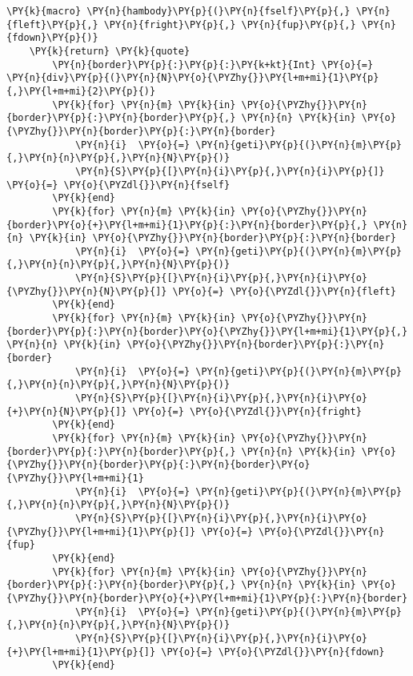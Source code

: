 \begin{Verbatim}[commandchars=\\\{\}]
\PY{k}{macro} \PY{n}{hambody}\PY{p}{(}\PY{n}{fself}\PY{p}{,} \PY{n}{fleft}\PY{p}{,} \PY{n}{fright}\PY{p}{,} \PY{n}{fup}\PY{p}{,} \PY{n}{fdown}\PY{p}{)}
    \PY{k}{return} \PY{k}{quote}
        \PY{n}{border}\PY{p}{:}\PY{p}{:}\PY{k+kt}{Int} \PY{o}{=} \PY{n}{div}\PY{p}{(}\PY{n}{N}\PY{o}{\PYZhy{}}\PY{l+m+mi}{1}\PY{p}{,}\PY{l+m+mi}{2}\PY{p}{)}
        \PY{k}{for} \PY{n}{m} \PY{k}{in} \PY{o}{\PYZhy{}}\PY{n}{border}\PY{p}{:}\PY{n}{border}\PY{p}{,} \PY{n}{n} \PY{k}{in} \PY{o}{\PYZhy{}}\PY{n}{border}\PY{p}{:}\PY{n}{border}
            \PY{n}{i}  \PY{o}{=} \PY{n}{geti}\PY{p}{(}\PY{n}{m}\PY{p}{,}\PY{n}{n}\PY{p}{,}\PY{n}{N}\PY{p}{)}
            \PY{n}{S}\PY{p}{[}\PY{n}{i}\PY{p}{,}\PY{n}{i}\PY{p}{]} \PY{o}{=} \PY{o}{\PYZdl{}}\PY{n}{fself}
        \PY{k}{end}
        \PY{k}{for} \PY{n}{m} \PY{k}{in} \PY{o}{\PYZhy{}}\PY{n}{border}\PY{o}{+}\PY{l+m+mi}{1}\PY{p}{:}\PY{n}{border}\PY{p}{,} \PY{n}{n} \PY{k}{in} \PY{o}{\PYZhy{}}\PY{n}{border}\PY{p}{:}\PY{n}{border}
            \PY{n}{i}  \PY{o}{=} \PY{n}{geti}\PY{p}{(}\PY{n}{m}\PY{p}{,}\PY{n}{n}\PY{p}{,}\PY{n}{N}\PY{p}{)}
            \PY{n}{S}\PY{p}{[}\PY{n}{i}\PY{p}{,}\PY{n}{i}\PY{o}{\PYZhy{}}\PY{n}{N}\PY{p}{]} \PY{o}{=} \PY{o}{\PYZdl{}}\PY{n}{fleft}
        \PY{k}{end}
        \PY{k}{for} \PY{n}{m} \PY{k}{in} \PY{o}{\PYZhy{}}\PY{n}{border}\PY{p}{:}\PY{n}{border}\PY{o}{\PYZhy{}}\PY{l+m+mi}{1}\PY{p}{,} \PY{n}{n} \PY{k}{in} \PY{o}{\PYZhy{}}\PY{n}{border}\PY{p}{:}\PY{n}{border}
            \PY{n}{i}  \PY{o}{=} \PY{n}{geti}\PY{p}{(}\PY{n}{m}\PY{p}{,}\PY{n}{n}\PY{p}{,}\PY{n}{N}\PY{p}{)}
            \PY{n}{S}\PY{p}{[}\PY{n}{i}\PY{p}{,}\PY{n}{i}\PY{o}{+}\PY{n}{N}\PY{p}{]} \PY{o}{=} \PY{o}{\PYZdl{}}\PY{n}{fright}
        \PY{k}{end}
        \PY{k}{for} \PY{n}{m} \PY{k}{in} \PY{o}{\PYZhy{}}\PY{n}{border}\PY{p}{:}\PY{n}{border}\PY{p}{,} \PY{n}{n} \PY{k}{in} \PY{o}{\PYZhy{}}\PY{n}{border}\PY{p}{:}\PY{n}{border}\PY{o}{\PYZhy{}}\PY{l+m+mi}{1}
            \PY{n}{i}  \PY{o}{=} \PY{n}{geti}\PY{p}{(}\PY{n}{m}\PY{p}{,}\PY{n}{n}\PY{p}{,}\PY{n}{N}\PY{p}{)}
            \PY{n}{S}\PY{p}{[}\PY{n}{i}\PY{p}{,}\PY{n}{i}\PY{o}{\PYZhy{}}\PY{l+m+mi}{1}\PY{p}{]} \PY{o}{=} \PY{o}{\PYZdl{}}\PY{n}{fup}
        \PY{k}{end}
        \PY{k}{for} \PY{n}{m} \PY{k}{in} \PY{o}{\PYZhy{}}\PY{n}{border}\PY{p}{:}\PY{n}{border}\PY{p}{,} \PY{n}{n} \PY{k}{in} \PY{o}{\PYZhy{}}\PY{n}{border}\PY{o}{+}\PY{l+m+mi}{1}\PY{p}{:}\PY{n}{border}
            \PY{n}{i}  \PY{o}{=} \PY{n}{geti}\PY{p}{(}\PY{n}{m}\PY{p}{,}\PY{n}{n}\PY{p}{,}\PY{n}{N}\PY{p}{)}
            \PY{n}{S}\PY{p}{[}\PY{n}{i}\PY{p}{,}\PY{n}{i}\PY{o}{+}\PY{l+m+mi}{1}\PY{p}{]} \PY{o}{=} \PY{o}{\PYZdl{}}\PY{n}{fdown}
        \PY{k}{end}

\end{Verbatim}
